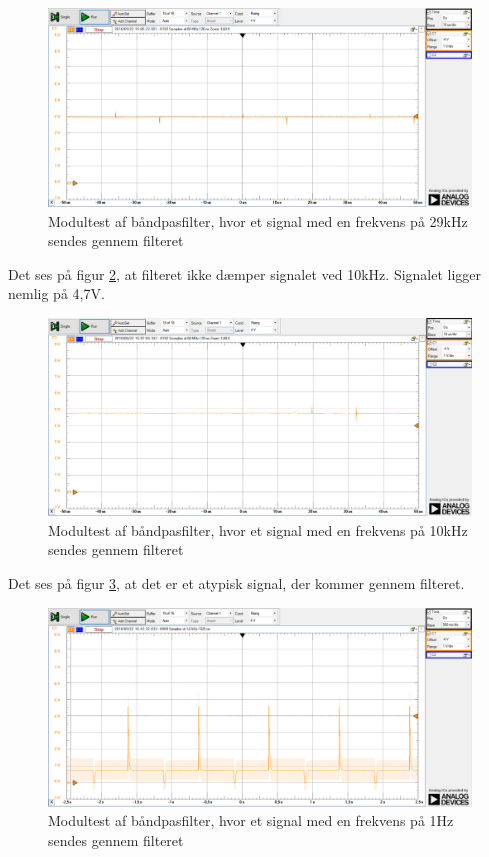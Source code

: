 \begin{figure}[H]
	\centering
	\includegraphics[width=\textwidth]{Test/images/AffyringTest/BaandpasfilterTest/29kHz}
	\caption{Modultest af båndpasfilter, hvor et signal med en frekvens på 29kHz sendes gennem filteret}
	\label{fig:29kHz}
\end{figure}

Det ses på figur \ref{fig:10kHz}, at filteret ikke dæmper signalet ved 10kHz. Signalet ligger nemlig på 4,7V. 

\begin{figure}[H]
	\centering
	\includegraphics[width=\textwidth]{Test/images/AffyringTest/BaandpasfilterTest/10kHz}
	\caption{Modultest af båndpasfilter, hvor et signal med en frekvens på 10kHz sendes gennem filteret}
	\label{fig:10kHz}
\end{figure}

Det ses på figur \ref{fig:1Hz}, at det er et atypisk signal, der kommer gennem filteret. 

\begin{figure}[H]
	\centering
	\includegraphics[width=\textwidth]{Test/images/AffyringTest/BaandpasfilterTest/1Hz}
	\caption{Modultest af båndpasfilter, hvor et signal med en frekvens på 1Hz sendes gennem filteret}
	\label{fig:1Hz}
\end{figure}

